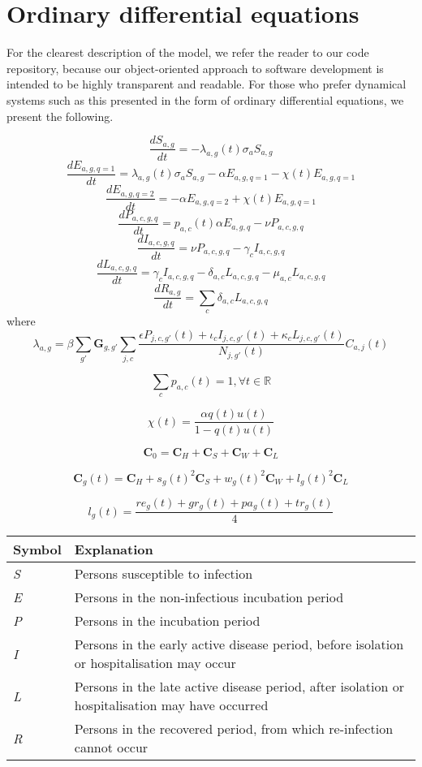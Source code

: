 
\section{Ordinary differential equations}

For the clearest description of the model, we refer the reader to our code repository, because our object-oriented approach to software development is intended to be highly transparent and readable. For those who prefer dynamical systems such as this presented in the form of ordinary differential equations, we present the following.

\[\frac{dS_{a,g}}{dt}=-\lambda_{a,g}(t) \sigma_{a} S_{a,g}\]
\[\frac{dE_{a,g,q=1}}{dt}=\lambda_{a,g}(t) \sigma_{a} S_{a,g} -\alpha E_{a,g,q=1} - \chi(t) E_{a,g,q=1} \]
\[\frac{dE_{a,g,q=2}}{dt}=-\alpha E_{a,g,q=2} + \chi(t) E_{a,g,q=1} \]
\[\frac{dP_{a,c,g,q}}{dt}=p_{a,c}(t) \alpha E_{a,g,q}-\nu P_{a,c,g,q}\]
\[\frac{dI_{a,c,g,q}}{dt}=\nu P_{a,c,g,q}-\gamma_{c}I_{a,c,g,q}\]
\[\frac{dL_{a,c,g,q}}{dt}=\gamma_{c}I_{a,c,g,q}-\delta_{a,c}L_{a,c,g,q}-\mu_{a,c}L_{a,c,g,q}\]
\[\frac{dR_{a,g}}{dt}=\sum_{c}{}\delta_{a,c}L_{a,c,g,q}\]
where
\[\lambda_{a,g}=\beta \sum_{g'}\textbf{G}_{g,g'} \sum_{j,c}\frac{\epsilon P_{j,c,g'}(t)+\iota_{c}I_{j,c,g'}(t)+\kappa_{c}L_{j,c,g'}(t)}{N_{j,g'}(t)} C_{a,j}(t)\]

\[\sum_{c}p_{a,c}(t)=1,\forall t\in\mathbb{R}\]

\[\chi(t) = \frac{\alpha q(t) u(t)}{1 - q(t) u(t)}\]

\[\textbf{C}_{0}=\textbf{C}_{H}+\textbf{C}_{S}+\textbf{C}_{W}+\textbf{C}_{L}\]

\[\textbf{C}_{g}(t)=\textbf{C}_{H}+s_{g}(t)^{2}\textbf{C}_{S}+w_{g}(t)^{2}\textbf{C}_{W}+l_{g}(t)^{2}\textbf{C}_{L}\]

\[l_{g}(t)=\frac{re_{g}(t)+gr_{g}(t)+pa_{g}(t)+tr_{g}(t)}{4}\]

\begin{table}[ht]
\renewcommand{\baselinestretch}{1}
    	\begin{tabular}{| p{2cm} | p{11.1cm} |}
    	\hline
    		Symbol & Explanation \\
	    	\hline
	    	\textit{S} & Persons susceptible to infection \\
    		\textit{E} & Persons in the non-infectious incubation period \\
    		\textit{P} & Persons in the incubation period \\
    		\textit{I} & Persons in the early active disease period, before isolation or hospitalisation may occur \\
    		\textit{L} & Persons in the late active disease period, after isolation or hospitalisation may have occurred \\
    		\textit{R} & Persons in the recovered period, from which re-infection cannot occur \\
    		\hline
	\end{tabular}
\end{table}


